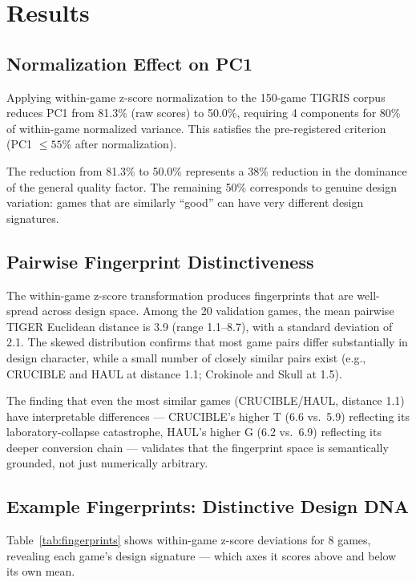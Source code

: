 \section{Results}
\label{sec:results}

\subsection{Normalization Effect on PC1}

Applying within-game z-score normalization to the 150-game TIGRIS corpus reduces
PC1 from 81.3\% (raw scores) to 50.0\%, requiring 4 components for 80\% of
within-game normalized variance. This satisfies the pre-registered criterion
(PC1 $\leq 55\%$ after normalization).

The reduction from 81.3\% to 50.0\% represents a 38\% reduction in the dominance of
the general quality factor. The remaining 50\% corresponds to genuine design
variation: games that are similarly ``good'' can have very different design signatures.

\subsection{Pairwise Fingerprint Distinctiveness}

The within-game z-score transformation produces fingerprints that are well-spread
across design space. Among the 20 validation games, the mean pairwise TIGER
Euclidean distance is 3.9 (range 1.1--8.7), with a standard deviation of 2.1.
The skewed distribution confirms that most game pairs differ substantially
in design character, while a small number of closely similar pairs exist
(e.g., CRUCIBLE and HAUL at distance 1.1; Crokinole and Skull at 1.5).

The finding that even the most similar games (CRUCIBLE/HAUL, distance 1.1)
have interpretable differences --- CRUCIBLE's higher T (6.6 vs.\ 5.9) reflecting
its laboratory-collapse catastrophe, HAUL's higher G (6.2 vs.\ 6.9) reflecting
its deeper conversion chain --- validates that the fingerprint space is semantically
grounded, not just numerically arbitrary.

\subsection{Example Fingerprints: Distinctive Design DNA}

Table~\ref{tab:fingerprints} shows within-game z-score deviations for 8 games,
revealing each game's design signature --- which axes it scores above and below
its own mean.

